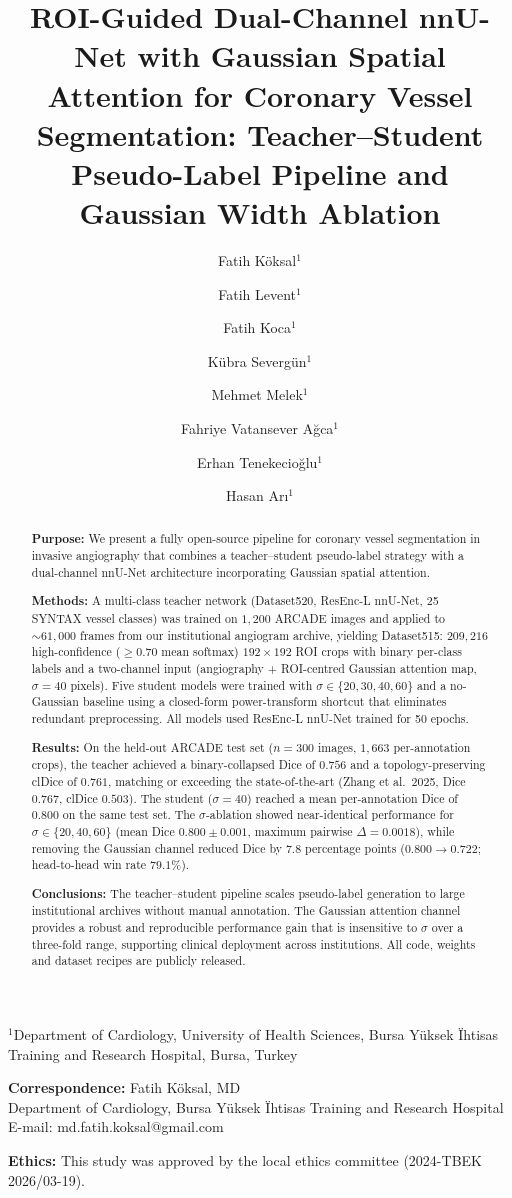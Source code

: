 \documentclass[12pt]{article}
\title{ROI-Guided Dual-Channel nnU-Net with Gaussian Spatial Attention for
Coronary Vessel Segmentation: Teacher–Student Pseudo-Label Pipeline
and Gaussian Width Ablation}
\author{Fatih K\"{o}ksal$^{1}$ \and
        Fatih Levent$^{1}$ \and
        Fatih Koca$^{1}$ \and
        K\"{u}bra Severg\"{u}n$^{1}$ \and
        Mehmet Melek$^{1}$ \and
        Fahriye Vatansever A\u{g}ca$^{1}$ \and
        Erhan Tenekecio\u{g}lu$^{1}$ \and
        Hasan Ar{\i}$^{1}$}
\date{}
\begin{document}
\maketitle

\noindent
$^{1}$Department of Cardiology, University of Health Sciences,
Bursa Y\"{u}ksek \"{I}htisas Training and Research Hospital, Bursa, Turkey

\medskip
\noindent\textbf{Correspondence:} Fatih K\"{o}ksal, MD\\
Department of Cardiology, Bursa Y\"{u}ksek \"{I}htisas Training and Research
Hospital\\
E-mail: md.fatih.koksal@gmail.com

\medskip
\noindent\textbf{Ethics:} This study was approved by the local ethics committee
(2024-TBEK 2026/03-19).

\begin{abstract}
\textbf{Purpose:}
We present a fully open-source pipeline for coronary vessel segmentation in
invasive angiography that combines a teacher–student pseudo-label strategy with
a dual-channel nnU-Net architecture incorporating Gaussian spatial attention.

\textbf{Methods:}
A multi-class teacher network (Dataset520, ResEnc-L nnU-Net, 25 SYNTAX vessel
classes) was trained on $1{,}200$ ARCADE images and applied to ${\sim}61{,}000$
frames from our institutional angiogram archive, yielding Dataset515: $209{,}216$
high-confidence ($\geq0.70$ mean softmax) $192\times192$ ROI crops with binary
per-class labels and a two-channel input (angiography + ROI-centred Gaussian
attention map, $\sigma{=}40$ pixels). Five student models were trained with
$\sigma \in \{20, 30, 40, 60\}$ and a no-Gaussian baseline using a closed-form
power-transform shortcut that eliminates redundant preprocessing. All models
used ResEnc-L nnU-Net trained for 50 epochs.

\textbf{Results:}
On the held-out ARCADE test set ($n{=}300$ images, $1{,}663$ per-annotation
crops), the teacher achieved a binary-collapsed Dice of $0.756$ and a
topology-preserving clDice of $0.761$, matching or exceeding the state-of-the-art
(Zhang et al.\ 2025, Dice $0.767$, clDice $0.503$). The student ($\sigma{=}40$)
reached a mean per-annotation Dice of $0.800$ on the same test set. The
$\sigma$-ablation showed near-identical performance for $\sigma \in \{20, 40, 60\}$
(mean Dice $0.800 \pm 0.001$, maximum pairwise $\Delta{=}0.0018$), while removing
the Gaussian channel reduced Dice by $7.8$ percentage points ($0.800 \to 0.722$;
head-to-head win rate $79.1\%$).

\textbf{Conclusions:}
The teacher–student pipeline scales pseudo-label generation to large institutional
archives without manual annotation. The Gaussian attention channel provides a
robust and reproducible performance gain that is insensitive to $\sigma$ over a
three-fold range, supporting clinical deployment across institutions.
All code, weights and dataset recipes are publicly released.
\end{abstract}
\end{document}
